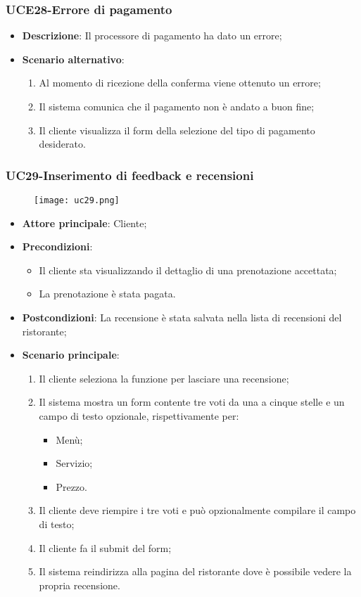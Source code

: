 \subsubsection{UCE28-Errore di pagamento}

\begin{itemize}
\item \textbf{Descrizione}: Il processore di pagamento ha dato un errore;
\item \textbf{Scenario alternativo}:
\begin{enumerate}
\item Al momento di ricezione della conferma viene ottenuto un errore;
\item Il sistema comunica che il pagamento non è andato a buon fine;
\item Il cliente visualizza il form della selezione del tipo di pagamento desiderato.
\end{enumerate}
\end{itemize}

\subsubsection{UC29-Inserimento di feedback e recensioni}
\begin{figure}[h] \texttt{[image: uc29.png]} \end{figure}

\begin{itemize}
\item \textbf{Attore principale}: Cliente;
\item \textbf{Precondizioni}:
\begin{itemize}
\item Il cliente sta visualizzando il dettaglio di una prenotazione accettata;
\item La prenotazione è stata pagata.
\end{itemize}
\item \textbf{Postcondizioni}: La recensione è stata salvata nella lista di recensioni del ristorante;
\item \textbf{Scenario principale}:
\begin{enumerate}
\item Il cliente seleziona la funzione per lasciare una recensione;
\item Il sistema mostra un form contente tre voti da una a cinque stelle e un campo di testo opzionale, rispettivamente per:
\begin{itemize}
\item Menù;
\item Servizio;
\item Prezzo.
\end{itemize}
\item Il cliente deve riempire i tre voti e può opzionalmente compilare il campo di testo;
\item Il cliente fa il submit del form;
\item Il sistema reindirizza alla pagina del ristorante dove è possibile vedere la propria recensione.
\end{enumerate}
\end{itemize}

